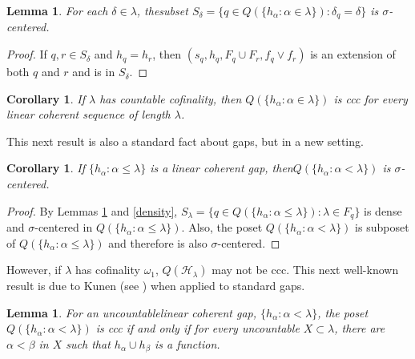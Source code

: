 \documentclass{amsart}
\newtheorem{corollary}[thm]{Corollary}
\newtheorem{lemma}[thm]{Lemma}
\theoremstyle{definition}
\theoremstyle{remark}
\begin{document}
  \begin{lemma}  For each $\delta\in \lambda$,
  the\label{centered} subset $S_\delta = \{ q\in Q(\{h_\alpha : \alpha \in \lambda\}): 
   \delta_q = \delta\}$ is $\sigma$-centered.
\end{lemma}

\begin{proof}     
 If
 $q,r\in S_\delta$ and $h_q=h_r$, then 
  $( s_q, h_q, F_q\cup F_r , f_q\vee f_r)$ is an extension
  of both $q$ and $r$ and is in $S_\delta$.
\end{proof}

 \begin{corollary}  If $\lambda$ has countable cofinality,
  then $Q(\{h_\alpha : \alpha\in\lambda\})$ is ccc 
  for every linear coherent sequence of length $\lambda$.
 \end{corollary}

 This next result is also a standard fact about gaps, but 
in a new setting.

\begin{corollary}  If $\{ h_\alpha : \alpha \leq  \lambda\}$ 
is a linear coherent gap, then\label{successor} 
 $Q(\{ h_\alpha : \alpha < \lambda\})$ is $\sigma$-centered. 
\end{corollary}

\begin{proof} By Lemmas \ref{centered} and \ref{density},
   $S_\lambda = \{ q\in Q(\{ h_\alpha : \alpha \leq \lambda\}):
    \lambda\in F_q\}$ 
   is dense and $\sigma$-centered in 
   $ Q(\{ h_\alpha : \alpha \leq \lambda\})$.
 Also, the    poset
$   Q(\{ h_\alpha : \alpha < \lambda\})$ is  subposet
of $Q(\{ h_\alpha : \alpha \leq \lambda\})$ 
and therefore is also $\sigma$-centered.
\end{proof}

 


 
 However, if $\lambda$ has cofinality $\omega_1$, 
  $Q(\mathcal H_\lambda)$ may not be ccc. 
    This next well-known  result is  due to Kunen
    (see \cite{Scheepers}) when applied to standard gaps.  


  \begin{lemma} For  an uncountable\label{cccequivalent}
  linear coherent gap, $\{ h_\alpha : \alpha<\lambda\}$,
the poset   $  Q(\{ h_\alpha :\alpha < \lambda\})$ is ccc 
if and only if 
for every uncountable $X\subset\lambda$, there are
$\alpha< \beta$ in $X$ such that $h_\alpha\cup h_\beta$ is a function.
  \end{lemma}
\end{document}
